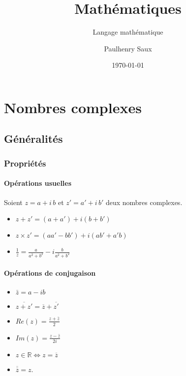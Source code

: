 \documentclass[french]{yLectureNote}
\title{Mathématiques}
\subtitle{Langage mathématique}
\author{Paulhenry Saux}
\date{\today}
\newcommand{\bz}{\overline{z}}
\begin{document}
\setcounter{chapter}{5}

	\chapter{Nombres complexes}
\section{Généralités}
\subsection{Propriétés}
\subsubsection{Opérations usuelles}
Soient $z=a+i\,b$ et $z'=a'+i\,b'$ deux nombres complexes.

\begin{itemize}
 \item $\displaystyle z+z'=(a+a')+i(b+b')$
 \item $\displaystyle z\times z'=(aa'-bb')+i(ab'+a'b)$
 \item $\displaystyle\frac{1}{z}=\frac{a}{a^2+b^2}-i\frac{b}{a^2+b^2}$
\end{itemize}
\subsubsection{Opérations de conjugaison}
\begin{itemize}
 \item $\displaystyle \bar{z} = a-ib$
 \item $\displaystyle\overline{z+z'} = \overline{z}+\overline{z'}$
 \item $\displaystyle Re(z) = \frac{z+\bar{z}}{2}$
  \item $\displaystyle Im(z) = \frac{z-\bar{z}}{2i}$
  \item $\displaystyle z\in\mathbb{R} \iff z = \bz$
  \item $\displaystyle\overline{\overline{z}} = z$.
\end{itemize}
\end{document}
